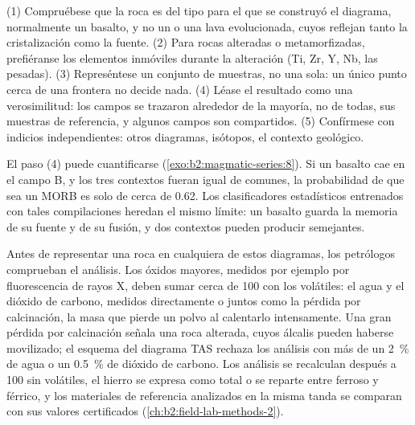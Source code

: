 \begin{method}\label{met:b2:magmatic-series:discrimination}
(1) Compruébese que la roca es del tipo para el que se construyó el diagrama, normalmente un basalto, y
no un  o una lava evolucionada, cuyos  reflejan tanto la cristalización
como la fuente. (2) Para rocas alteradas o metamorfizadas, prefiéranse los elementos inmóviles durante la alteración (Ti, Zr, Y, Nb, las 
pesadas). (3) Represéntese un conjunto de muestras, no una sola:
un único punto cerca de una frontera no decide nada. (4) Léase el resultado como una verosimilitud:
los campos se trazaron alrededor de la mayoría, no de todas, sus muestras de referencia, y algunos campos
son compartidos. (5) Confírmese con indicios independientes: otros diagramas, isótopos, el
contexto geológico.
\end{method}

El paso (4) puede cuantificarse (\cref{exo:b2:magmatic-series:8}). Si un basalto cae en el campo B, y los
tres contextos fueran igual de comunes, la probabilidad de que sea un MORB es solo de cerca de 0.62.
Los clasificadores estadísticos entrenados con tales compilaciones heredan el mismo límite: un basalto
guarda la memoria de su fuente y de su fusión, y dos contextos pueden producir 
semejantes.

\begin{inthelab}
Antes de representar una roca en cualquiera de estos diagramas, los petrólogos comprueban el análisis. Los
óxidos mayores, medidos por ejemplo por fluorescencia de rayos X, deben sumar cerca de 100
con los volátiles: el agua y el dióxido de carbono, medidos directamente o juntos como la
pérdida por calcinación, la masa que pierde un polvo al calentarlo intensamente. Una gran pérdida por
calcinación señala una roca alterada, cuyos álcalis pueden haberse movilizado; el esquema del diagrama
TAS rechaza los análisis con más de un \qty{2}{\percent} de agua o un
\qty{0.5}{\percent} de dióxido de carbono. Los análisis se recalculan después a 100 sin
volátiles, el hierro se expresa como  total o se reparte entre ferroso y férrico,
y los materiales de referencia analizados en la misma tanda se comparan con sus valores
certificados (\cref{ch:b2:field-lab-methods-2}).
\end{inthelab}

